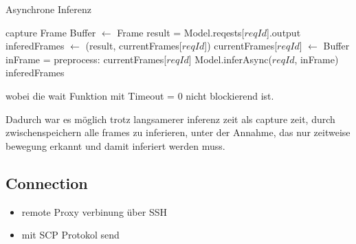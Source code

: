 





\begin{algorithm}[H]
    \caption{Asynchrone Inferenz}
    \begin{algorithmic}
    \WHILE{\TRUE}
        \STATE capture Frame
            \STATE Buffer $\leftarrow$ Frame
        \ENDIF
                \STATE result = Model.reqests[$reqId$].output
                \STATE inferedFrames $\leftarrow$ (result, currentFrames[$reqId$])
                    \STATE currentFrames[$reqId$] $\leftarrow$ Buffer 
                    \STATE inFrame = preprocess: currentFrames[$reqId$]
                    \STATE Model.inferAsync($reqId$, inFrame)
                \ENDIF
            \ENDIF
        \ENDFOR
        \RETURN inferedFrames
    \ENDWHILE
    \end{algorithmic}
\end{algorithm}

wobei die wait Funktion mit Timeout = 0 nicht blockierend ist.

Dadurch war es möglich trotz langsamerer inferenz zeit als 
capture zeit, durch zwischenspeichern alle frames zu inferieren, 
unter der Annahme, das nur zeitweise bewegung erkannt und damit 
inferiert werden muss.



\subsection*{Connection}

\begin{itemize}
    \item remote Proxy verbinung über SSH
    \item mit SCP Protokol send
\end{itemize}





